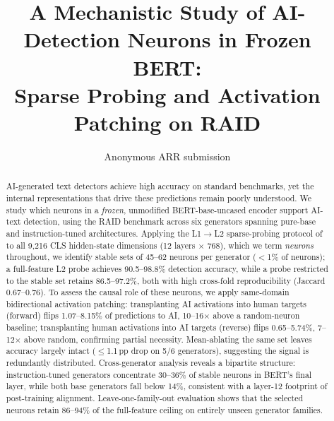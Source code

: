 \documentclass[11pt]{article}
\title{A Mechanistic Study of AI-Detection Neurons in Frozen BERT:\\
Sparse Probing and Activation Patching on RAID}
\author{Anonymous ARR submission}
\newcommand{\bertbase}{BERT-base-uncased\xspace}
\begin{document}
\maketitle

\begin{abstract}
AI-generated text detectors achieve high accuracy on standard benchmarks, yet the internal representations that drive these predictions remain poorly understood. We study which neurons in a \textit{frozen}, unmodified \bertbase encoder support AI-text detection, using the RAID benchmark across six generators spanning pure-base and instruction-tuned architectures. Applying the L1$\to$L2 sparse-probing protocol of \citet{gurnee2023haystack} to all 9,216 CLS hidden-state dimensions (12 layers $\times$ 768), which we term \textit{neurons} throughout, we identify stable sets of 45--62 neurons per generator ($<$1\% of neurons); a full-feature L2 probe achieves 90.5--98.8\% detection accuracy, while a probe restricted to the stable set retains 86.5--97.2\%, both with high cross-fold reproducibility (Jaccard 0.67--0.76). To assess the causal role of these neurons, we apply same-domain bidirectional activation patching: transplanting AI activations into human targets (forward) flips 1.07--8.15\% of predictions to AI, 10--16$\times$ above a random-neuron baseline; transplanting human activations into AI targets (reverse) flips 0.65--5.74\%, 7--12$\times$ above random, confirming partial necessity. Mean-ablating the same set leaves accuracy largely intact ($\leq$1.1\,pp drop on 5/6 generators), suggesting the signal is redundantly distributed. Cross-generator analysis reveals a bipartite structure: instruction-tuned generators concentrate 30--36\% of stable neurons in BERT's final layer, while both base generators fall below 14\%, consistent with a layer-12 footprint of post-training alignment. Leave-one-family-out evaluation shows that the selected neurons retain 86--94\% of the full-feature ceiling on entirely unseen generator families.
\end{abstract}

\end{document}
